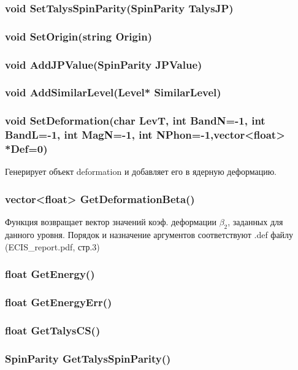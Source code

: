 \documentclass[a4paper,12pt]{extarticle}
\begin{document}
\subsubsection{void SetTalysSpinParity(SpinParity TalysJP)}

\subsubsection{void SetOrigin(string Origin)} 

\subsubsection{void AddJPValue(SpinParity JPValue)}
 
\subsubsection{void AddSimilarLevel(Level* SimilarLevel)}
 
\subsubsection{void SetDeformation(char LevT, int BandN=-1, int BandL=-1, int MagN=-1, int NPhon=-1,vector<float> *Def=0)}
Генерирует объект deformation и добавляет его в ядерную деформацию.
\subsubsection{vector<float> GetDeformationBeta()}
Функция возвращает вектор значений коэф. деформации $\beta_2$, заданных для данного уровня.
Порядок и назначение аргументов соответствуют .def файлу (ECIS\_report.pdf, стр.3)
\subsubsection{float GetEnergy()} 

\subsubsection{float GetEnergyErr()}

\subsubsection{float GetTalysCS()} 

\subsubsection{SpinParity GetTalysSpinParity()}
\end{document}
